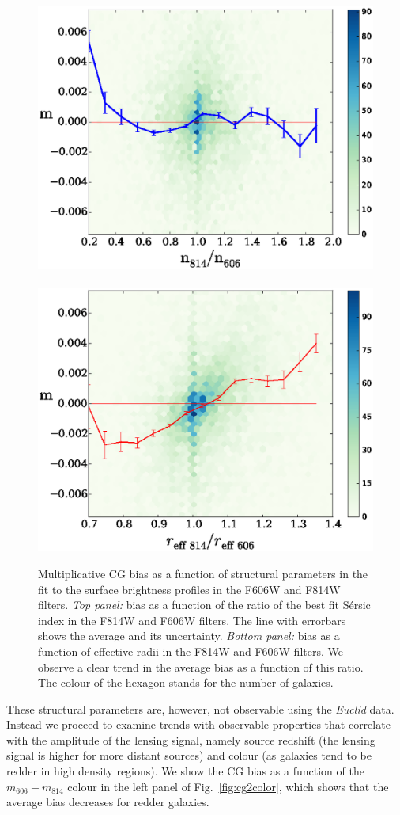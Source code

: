 \documentclass[useAMS,usenatbib]{mnras}
\begin{document}
\begin{figure}
\hbox{%
\includegraphics[width=0.5\hsize]{zcgbheat-ne29.eps}
\includegraphics[width=0.5\hsize]{zcgbheat-re29.eps}}
\caption{Multiplicative CG bias as a function of structural parameters
  in the fit to the surface brightness profiles in the F606W and F814W
  filters. {\it Top panel:} bias as a function of the ratio of the
  best fit S{\'e}rsic index in the F814W and F606W filters. The line
  with errorbars shows the average and its uncertainty. {\it Bottom
    panel:} bias as a function of effective radii in the F814W and
  F606W filters. We observe a clear trend in the average bias as a
  function of this ratio. The colour of the hexagon stands for the number of galaxies.}
\label{fig:cg2fitpar}
\end{figure}

These structural parameters are, however, not observable using the {\it Euclid} data. Instead we proceed to examine trends with observable properties that correlate with the amplitude of the lensing signal, namely source redshift (the lensing signal is higher for more distant sources) and colour (as galaxies tend to be redder in high density regions). We show the CG bias as a function of the $m_{606}-m_{814}$ colour in the left panel of Fig.~\ref{fig:cg2color}, which shows that the average bias decreases for redder galaxies.
\end{document}
